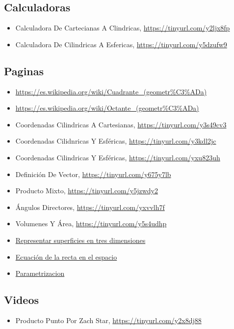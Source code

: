 \documentclass{article}
\begin{document}
\subsection{Calculadoras}
\label{sec:orge6d2e39}
\begin{itemize}
\item Calculadora De Cartecianas A Clindricas, \url{https://tinyurl.com/y2ljx8fp}
\item Calculadora De Cilindricas A Esfericas, \url{https://tinyurl.com/y5dzufw9}
\end{itemize}

\subsection{Paginas}
\label{sec:orga5c53f5}
\begin{itemize}
\item \url{https://es.wikipedia.org/wiki/Cuadrante\_(geometr\%C3\%ADa)}
\item \url{https://es.wikipedia.org/wiki/Octante\_(geometr\%C3\%ADa)}
\item Coordenadas Cilindricas A Cartesianas, \url{https://tinyurl.com/y3s49cv3}
\item Coordenadas Cilidnricas Y Esféricas, \url{https://tinyurl.com/y3kdl2jc}
\item Coordenadas Cilindricas Y Esféricas, \url{https://tinyurl.com/yxu823uh}
\item Definición De Vector, \url{https://tinyurl.com/y675y7lb}
\item Producto Mixto, \url{https://tinyurl.com/y5jzwdy2}
\item Ángulos Directores, \url{https://tinyurl.com/yxvvlh7f}
\item Volumenes Y Área, \url{https://tinyurl.com/y5s4udhp}
\item \href{https://www.gaussianos.com/representar-superficies-en-tres-dimensiones/}{Representar superficies en tres dimensiones}
\item \href{https://www.superprof.es/apuntes/escolar/matematicas/analitica/recta/ecuaciones-de-la-recta-en-el-espacio.html\#tema\_ecuacion-continua-de-la-recta}{Ecuación de la recta en el espacio}

\item \href{https://personales.unican.es/alvareze/CalculoWeb/CalculoII/apuntes/curvasParametricas.pdf}{Parametrizacion}
\end{itemize}

\subsection{Videos}
\label{sec:org50968c2}
\begin{itemize}
\item Producto Punto Por Zach Star, \url{https://tinyurl.com/y2x8dj88}
\end{itemize}
\end{document}
